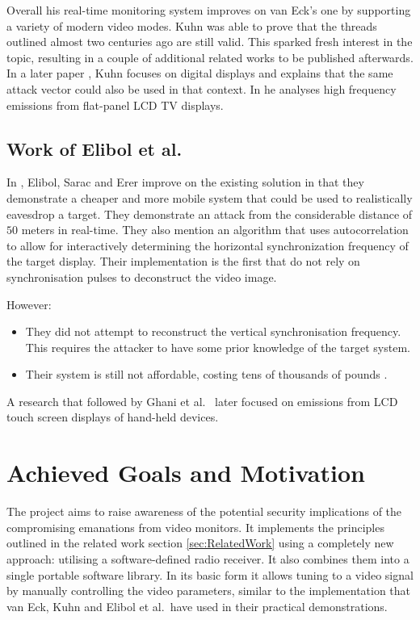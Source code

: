 \documentclass[a4paper,12pt,twoside,openright]{report}
\begin{document}
Overall his real-time monitoring system improves on van Eck's one by supporting a variety of modern video modes. Kuhn was able to prove that the threads outlined almost two centuries ago are still valid. This sparked fresh interest in the topic, resulting in a couple of additional related works to be published afterwards. In a later paper \cite{kuhn2005electromagnetic}, Kuhn focuses on digital displays and explains that the same attack vector could also be used in that context. In \cite{kuhn2011compromising} he analyses high frequency emissions from flat-panel LCD TV displays.

\subsection{Work of Elibol et al.}

In \cite{elibol2012realistic}, Elibol, Sarac and Erer improve on the existing solution in that they demonstrate a cheaper and more mobile system that could be used to realistically eavesdrop a target. They demonstrate an attack from the considerable distance of $50$ meters in real-time. They also mention an algorithm that uses autocorrelation to allow for interactively determining the horizontal synchronization frequency of the target display. Their implementation is the first that do not rely on synchronisation pulses to deconstruct the video image.

However:

\begin{itemize}

  \item They did not attempt to reconstruct the vertical synchronisation frequency. This requires the attacker to have some prior knowledge of the target system.
  \item Their system is still not affordable, costing tens of thousands of pounds \cite{nipxi5665}.

\end{itemize}

A research that followed by Ghani et al.\ \cite{ghani2013radiated} later focused on emissions from LCD touch screen displays of hand-held devices.

\section{Achieved Goals and Motivation}

The project aims to raise awareness of the potential security implications of the compromising emanations from video monitors. It implements the principles outlined in the related work section \ref{sec:RelatedWork} using a completely new approach: utilising a software-defined radio receiver. It also combines them into a single portable software library. In its basic form it allows tuning to a video signal by manually controlling the video parameters, similar to the implementation that van Eck, Kuhn and Elibol et al.\ have used in their practical demonstrations.
\end{document}
